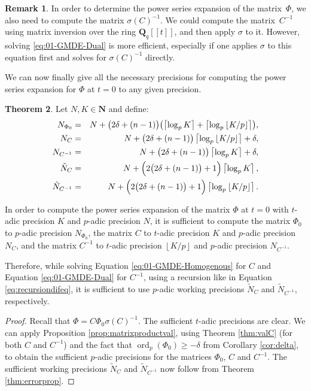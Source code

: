 \documentclass[a4paper,11pt]{article}
\numberwithin{equation}{section}
\providecommand{\floor}[1]{\left\lfloor#1\right\rfloor}   %
\providecommand{\ceil}[1]{\left\lceil#1\right\rceil}   %
\newcommand{\NN}{\mathbf{N}} %
\newcommand{\QQ}{\mathbf{Q}} %
\DeclareMathOperator{\ord}{ord}          %
\theoremstyle{definition}
\newtheorem{thm}{Theorem}[section]
\newtheorem{rem}[thm]{Remark}
\begin{document}
\begin{rem} \label{rem:sigmatrick}
In order to determine the power series expansion of the matrix~$\Phi$, 
we also need to compute the matrix $\sigma(C)^{-1}$. We could compute 
the matrix~$C^{-1}$ using matrix inversion over the ring $\mathbf{Q}_q[[t]]$,
and then apply $\sigma$ to it. However, solving \eqref{eq:01-GMDE-Dual} is 
more efficient, especially if one applies $\sigma$ to this equation first 
and solves for $\sigma(C)^{-1}$ directly.
\end{rem}

We can now finally give all the necessary precisions for computing the power series expansion for $\Phi$ at $t=0$ to
any given precision.

\begin{thm} \label{thm:Ni}
Let $N,K \in \NN$ and define:
\begin{eqnarray*}
N_{\Phi_0}   		&=& N+\bigl(2\delta+(n-1)\bigr) \bigl(\ceil{\log_p K} + \ceil{\log_p \floor{K/p}}\bigr),\\
N_{C}				&=& N+\bigl(2\delta+(n-1)\bigr) \ceil{\log_p \floor{K/p}} + \delta, \\
N_{C^{-1}}			&=& N+\bigl(2\delta+(n-1)\bigr) \ceil{\log_p K} + \delta, \\
\tilde{N}_C			&=& N+\Bigl(2 \bigl(2 \delta + (n-1)\bigr) + 1\Bigr) \ceil{\log_p K}, \\
\tilde{N}_{C^{-1}}	&=& N+\Bigl(2 \bigl(2 \delta + (n-1)\bigr) + 1\Bigr) \ceil{\log_p \floor{K/p}}.
\end{eqnarray*}

In order to compute the power series expansion 
of the matrix $\Phi$ at $t=0$ with $t$-adic precision $K$ and $p$-adic precision $N$, 
it is sufficient to compute
the matrix $\Phi_0$ to $p$-adic precision $N_{\Phi_0}$,
the matrix $C$ to $t$-adic precision $K$ and $p$-adic precision $N_{C}$, and
the matrix $C^{-1}$ to $t$-adic precision $\floor{K/p}$ and $p$-adic precision 
$N_{C^{-1}}$.

Therefore, while solving Equation \eqref{eq:01-GMDE-Homogenous} for $C$ and Equation \eqref{eq:01-GMDE-Dual} for $C^{-1}$, 
using a recursion like in Equation \eqref{eq:recursiondifeq}, it is sufficient to use $p$-adic 
working precisions $\tilde{N}_C$ and $\tilde{N}_{C^{-1}}$, respectively.
\end{thm}

\begin{proof}
Recall that $\Phi = C \Phi_0 \sigma(C)^{-1}$. The sufficient $t$-adic precisions are clear. 
We can apply Proposition \ref{prop:matrixproductval}, using Theorem \ref{thm:valC} (for both $C$ and $C^{-1}$) 
and the fact that $\ord_p(\Phi_0) \geq -\delta$ from Corollary \ref{cor:delta}, to obtain the sufficient $p$-adic 
precisions for the matrices $\Phi_0$, $C$ and $C^{-1}$. The sufficient working precisions $\tilde{N}_C$ and $\tilde{N}_{C^{-1}}$
now follow from Theorem \ref{thm:errorprop}.
\end{proof}
\end{document}
